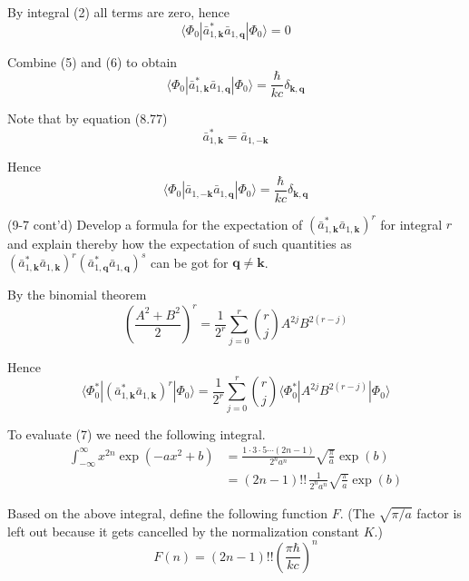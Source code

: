 \documentclass[12pt]{article}
\begin{document}
By integral (2) all terms are zero, hence
\begin{equation*}
\langle\Phi_0|\bar a_{1,\mathbf k}^*\bar a_{1,\mathbf q}|\Phi_0\rangle=0
\tag{6}
\end{equation*}

Combine (5) and (6) to obtain
\begin{equation*}
\langle\Phi_0|\bar a_{1,\mathbf k}^*\bar a_{1,\mathbf q}|\Phi_0\rangle=\frac{\hbar}{kc}\delta_{\mathbf k,\mathbf q}
\end{equation*}

Note that by equation (8.77)
\begin{equation*}
\bar a_{1,\mathbf k}^*=\bar a_{1,-\mathbf k}
\end{equation*}

Hence
\begin{equation*}
\langle\Phi_0|\bar a_{1,-\mathbf k}\bar a_{1,\mathbf q}|\Phi_0\rangle=\frac{\hbar}{kc}\delta_{\mathbf k,\mathbf q}
\end{equation*}

(9-7 cont'd)
Develop a formula for the expectation of
$(\bar a_{1,\mathbf k}^*\bar a_{1,\mathbf k})^r$
for integral $r$ and explain thereby how the expectation of such
quantities as
$(\bar a_{1,\mathbf k}^*\bar a_{1,\mathbf k})^r
(\bar a_{1,\mathbf q}^*\bar a_{1,\mathbf q})^s$
can be got for $\mathbf q\ne\mathbf k$.

\bigskip
By the binomial theorem
\begin{equation*}
\left(\frac{A^2+B^2}{2}\right)^r=\frac{1}{2^r}\sum_{j=0}^r\binom{r}{j}A^{2j}B^{2(r-j)}
\end{equation*}

Hence
\begin{equation*}
\langle\Phi_0^*|(\bar a_{1,\mathbf k}^*\bar a_{1,\mathbf k})^r|\Phi_0\rangle
=\frac{1}{2^r}
\sum_{j=0}^r\binom{r}{j}
\langle\Phi_0^*|A^{2j}B^{2(r-j)}|\Phi_0\rangle
\tag{7}
\end{equation*}

To evaluate (7) we need the following integral.
\begin{align*}
\int_{-\infty}^\infty x^{2n}\exp(-ax^2+b)
&=\frac{1\cdot3\cdot5\cdots(2n-1)}{2^na^n}\sqrt{\frac{\pi}{a}}\exp(b)
\\
&=(2n-1)!!\,\frac{1}{2^na^n}\sqrt{\frac{\pi}{a}}\exp(b)
\end{align*}

Based on the above integral, define the following function $F$.
(The $\sqrt{\pi/a}$ factor is left out because it gets cancelled by the normalization constant $K$.)
\begin{equation*}
F(n)=(2n-1)!!\left(\frac{\pi\hbar}{kc}\right)^n
\end{equation*}
\end{document}
